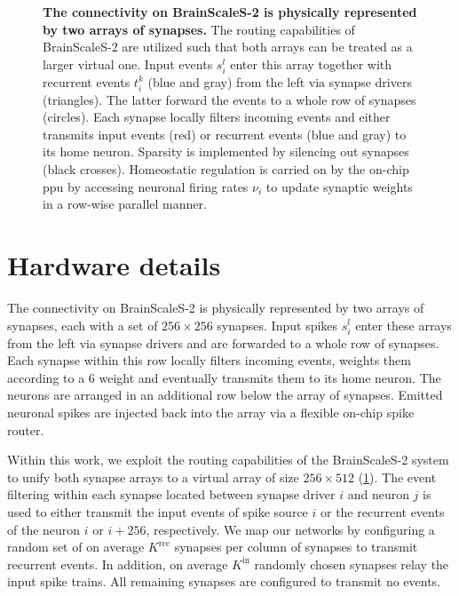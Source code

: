 \begin{figure}[t]
	\centering
	
	\caption{%
		\textbf{The connectivity on BrainScaleS-2 is physically represented by two arrays of synapses.}
		The routing capabilities of BrainScaleS-2 are utilized such that both arrays can be treated as a larger virtual one.
		Input events $s_i^l$ enter this array together with recurrent events $t_i^k$ (blue and gray) from the left via synapse drivers (triangles).
		The latter forward the events to a whole row of synapses (circles).
		Each synapse locally filters incoming events and either transmits input events (red) or recurrent events (blue and gray) to its home neuron.
		Sparsity is implemented by silencing out synapses (black crosses).
		Homeostatic regulation is carried on by the on-chip \acrshort{ppu} by accessing neuronal firing rates $\nu_i$ to update synaptic weights in a row-wise parallel manner.
	}
	\label{fig:routing}
\end{figure}

\section{Hardware details} \label{sec:appendix_hardware}

The connectivity on BrainScaleS-2 is physically represented by two arrays of synapses, each with a set of $256\times 256$ synapses.
Input spikes $s_i^l$ enter these arrays from the left via synapse drivers and are forwarded to a whole row of synapses.
Each synapse within this row locally filters incoming events, weights them according to a \SI{6}{\bit} weight and eventually transmits them to its home neuron.
The neurons are arranged in an additional row below the array of synapses.
Emitted neuronal spikes are injected back into the array via a flexible on-chip spike router.

Within this work, we exploit the routing capabilities of the BrainScaleS-2 system to unify both synapse arrays to a virtual array of size $256\times 512$ (\cref{fig:routing}).
The event filtering within each synapse located between synapse driver $i$ and neuron $j$ is used to either transmit the input events of spike source $i$ or the recurrent events of the neuron $i$ or $i + 256$, respectively.
We map our networks by configuring a random set of on average $K^\mathrm{rec}$ synapses per column of synapses to transmit recurrent events.
In addition, on average $K^\mathrm{in}$ randomly chosen synapses relay the input spike trains.
All remaining synapses are configured to transmit no events.

